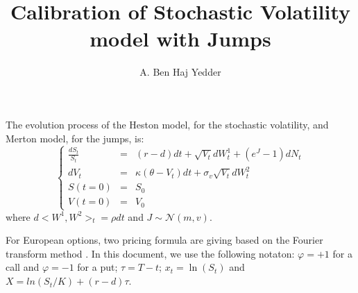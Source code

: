 \documentclass[12pt,a4paper]{article}
\title{Calibration of Stochastic Volatility model with Jumps}
\author{A. Ben Haj Yedder}
\def\dps{\displaystyle}
\def\N{\mathcal{N}}
\begin{document}
\maketitle
%
The evolution process of the Heston model, for the stochastic
volatility,  and Merton model, for the jumps, is:
%
\[
\left\{
\begin{array}{lll}
\dps \frac{d S_t}{S_t} &=& (r-d) dt + \sqrt{V_t} dW_t^1 + (e^J - 1) dN_t\\
\dps  d V_t &=& \kappa (\theta - V_t) dt + \sigma_v \sqrt{V_t} dW_t^2  \\
S(t=0) &=& S_0 \\
V(t=0) &=& V_0
\end{array}
\right.
\]
 where $d<W^1,W^2>_t = \rho dt$ and $J \sim \N(m,v)$.

For European options, two pricing formula are giving based on the
Fourier transform  method \cite{sepp}. In this document, we use
the following notaton: $\varphi=+1$ for a call and $\varphi=-1$
for a put; $\tau=T-t$; $x_t=\ln(S_t)$ and $X = ln(S_t/K) +
(r-d)\tau $.
%
\end{document}
